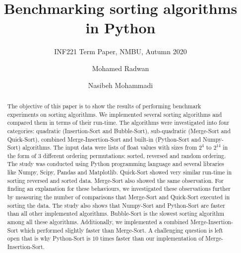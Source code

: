 \documentclass[sigconf, nonacm, natbib, screen, balance=False]{acmart}
\begin{document}
\title{Benchmarking sorting algorithms in Python}
\subtitle{INF221 Term Paper, NMBU, Autumn 2020}

\author{Mohamed Radwan}
\affiliation{}  %
\author{Nasibeh Mohammadi}

\begin{abstract}
The objective of this paper is to show the results of performing benchmark experiments on sorting algorithms. We implemented several sorting algorithms and compared them in terms of their run-time. The algorithms were investigated into four categories: quadratic (Insertion-Sort and Bubble-Sort), sub-quadratic (Merge-Sort and Quick-Sort), combined Merge-Insertion-Sort and built-in (Python-Sort and Numpy-Sort) algorithms. The input data were lists of float values with sizes from $2^{4}$ to $2^{14}$ in the form of $3$ different ordering permutations: sorted, reversed and random ordering. The study was conducted using Python programming language and several libraries like Numpy, Scipy, Pandas and Matplotlib. Quick-Sort showed very similar run-time in sorting reversed and sorted data. Merge-Sort also showed the same observation. For finding an explanation for these behaviours, we investigated these observations further by measuring the number of comparisons that Merge-Sort and Quick-Sort executed in sorting the data. The study also shows that Numpy-Sort and Python-Sort are faster than all other implemented algorithms. Bubble-Sort is the slowest sorting algorithm among all these algorithms. Additionally, we implemented a combined Merge-Insertion-Sort which performed slightly faster than Merge-Sort. A challenging question is left open that is why Python-Sort is $10$ times faster than our implementation of Merge-Insertion-Sort. 
\end{abstract}
\maketitle
\end{document}
